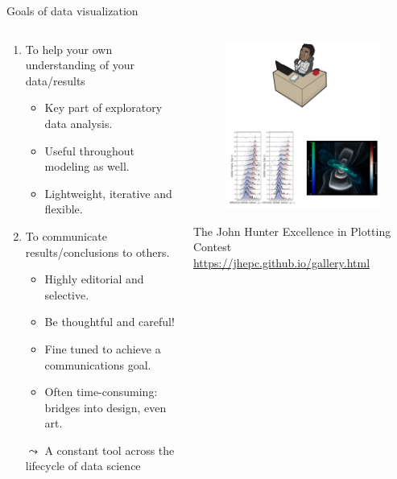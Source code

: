 \documentclass[aspectratio=169]{../latex_main/tntbeamer}  %
\begin{document}
	\begin{frame}[c]{Goals of data visualization}
	
	    \vspace{-1em}
	    \begin{columns}
	    \begin{column}{.6\textwidth}
	      \begin{enumerate}
	          \item To help your own understanding of your data/results
	          \begin{itemize}
	              \item Key part of exploratory data analysis.
	              \item Useful throughout modeling as well.
	              \item Lightweight, iterative and flexible.
	          \end{itemize}
	          \item To communicate results/conclusions to others.
	          \begin{itemize}
	              \item Highly editorial and selective. 
	              \item Be thoughtful and careful!
	              \item Fine tuned to achieve a communications goal.
	              \item Often time-consuming: bridges into design, even art.
	          \end{itemize}
	          $\leadsto$ A constant tool across the lifecycle of data science
	     \end{enumerate}

	     \end{column}
	    \begin{column}{.4\textwidth}
	        \begin{figure}
	            \centering
        	    \includegraphics[scale=.4]{Bild10}
	        \end{figure}
        	    The John Hunter Excellence in Plotting Contest\\
                \small \url{https://jhepc.github.io/gallery.html} 
	    

\end{column}
\end{columns}
\end{frame}
\end{document}
